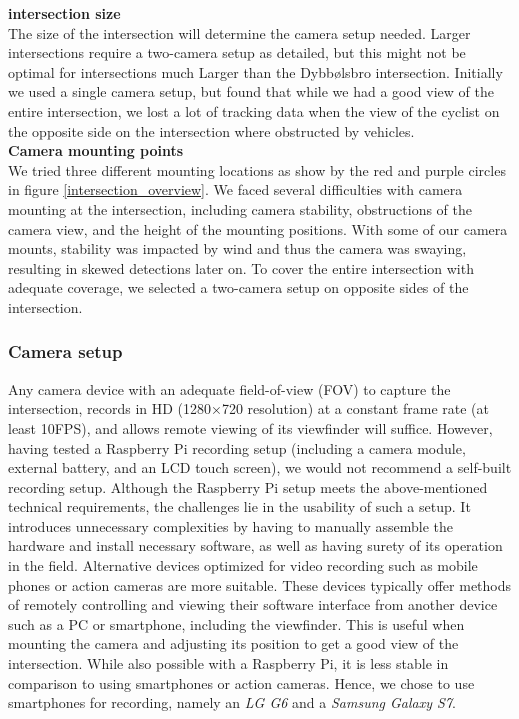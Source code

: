 \textbf{intersection size} \\
The size of the intersection will determine the camera setup needed. Larger intersections require a two-camera setup as detailed, 
but this might not be optimal for intersections much Larger than the Dybbølsbro intersection. 
Initially we used a single camera setup, but found that while we had a good view of the entire intersection, 
we lost a lot of tracking data when the view of the cyclist on the opposite side on the intersection where obstructed by vehicles.
\ \\

\textbf{Camera mounting points} \\
We tried three different mounting locations as show by the red and purple circles in figure \ref{intersection_overview}. 
We faced several difficulties with camera mounting at the intersection, including camera stability, 
obstructions of the camera view, and the height of the mounting positions. 
With some of our camera mounts, stability was impacted by wind and thus the camera was swaying, resulting in skewed detections later on.
To cover the entire intersection with adequate coverage, we selected a two-camera setup on opposite sides of the intersection.

\subsubsection{Camera setup}
Any camera device with an adequate field-of-view (FOV) to capture the intersection, records in HD (1280×720 resolution) at a constant 
frame rate (at least 10FPS), and allows remote viewing of its viewfinder will suffice. 
However, having tested a Raspberry Pi recording setup (including a camera module, external battery, and an LCD touch screen), 
we would not recommend a self-built recording setup. Although the Raspberry Pi setup meets the above-mentioned technical requirements, 
the challenges lie in the usability of such a setup. 
It introduces unnecessary complexities by having to manually assemble the hardware and install necessary software, as well as 
having surety of its operation in the field.
Alternative devices optimized for video recording such as mobile phones or action cameras are more suitable.
These devices typically offer methods of remotely controlling and viewing their software interface from 
another device such as a PC or smartphone, including the viewfinder. 
This is useful when mounting the camera and adjusting its position to get a good view of the intersection. 
While also possible with a Raspberry Pi, it is less stable in comparison to using smartphones or action cameras.
Hence, we chose to use smartphones for recording, namely an \textit{LG G6} and a \textit{Samsung Galaxy S7}.

